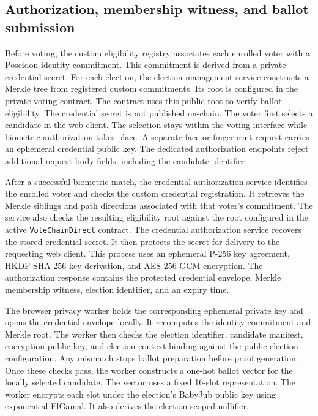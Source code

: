 
\subsection{Authorization, membership witness, and ballot submission}
\label{subsec:system-authorization-path}

Before voting, the custom eligibility registry associates each enrolled voter
with a Poseidon identity commitment. This commitment is derived from a private
credential secret. For each election, the election management service
constructs a Merkle tree from registered custom commitments. Its root is
configured in the private-voting contract. The contract uses this public
root to verify ballot eligibility. The credential secret is not published
on-chain.
The voter first selects a candidate in the web client. The selection stays
within the voting interface while biometric authorization takes place. A
separate face or fingerprint request carries an ephemeral credential public
key. The dedicated authorization endpoints reject additional request-body
fields, including the candidate identifier.

After a successful biometric match, the credential authorization service
identifies the enrolled voter and checks the custom credential registration.
It retrieves the Merkle siblings and path directions associated with that
voter's commitment. The service also checks the resulting eligibility root
against the root configured in the active \texttt{VoteChainDirect} contract.
The credential authorization service recovers the stored credential secret.
It then protects the secret for delivery to the requesting web client. This
process uses an ephemeral P-256 key agreement, HKDF-SHA-256 key derivation,
and AES-256-GCM encryption. The authorization response contains the protected
credential envelope, Merkle membership witness, election identifier, and an
expiry time.

The browser privacy worker holds the corresponding ephemeral private key and
opens the credential envelope locally. It recomputes the identity commitment
and Merkle root. The worker then checks the election identifier, candidate
manifest, encryption public key, and election-context binding against the
public election configuration. Any mismatch stops ballot preparation before
proof generation.
Once these checks pass, the worker constructs a one-hot ballot vector for the
locally selected candidate. The vector uses a fixed 16-slot representation.
The worker encrypts each slot under the election's BabyJub public key using
exponential ElGamal. It also derives the election-scoped nullifier.

